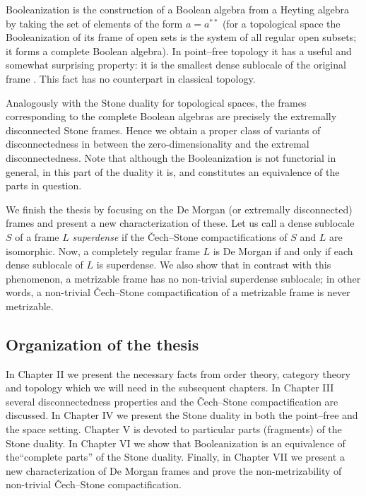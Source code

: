 \medskip

Booleanization is the construction of a Boolean algebra from a Heyting algebra by taking the set of elements of the form $a=a^{**}$ (for a topological space the Booleanization of its frame of open sets is the system of all regular open subsets; it forms a complete Boolean algebra). In point--free topology it has a useful and somewhat surprising property: it is the smallest dense sublocale of the original frame \cite{isbell1972atomless}. This fact has no counterpart in classical topology. 

Analogously with the Stone duality for topological spaces, the frames corresponding to the complete Boolean algebras are precisely the extremally disconnected Stone frames. Hence we obtain a proper class of variants of disconnectedness in between the zero-dimensionality and the extremal disconnectedness. Note that although the Booleanization is not functorial in general, in this part of the duality it is, and constitutes an equivalence of the parts in question.

\medskip 

 We finish the thesis by focusing on the De Morgan (or extremally disconnected) frames and present a new
 characterization of these. Let  us call a dense  sublocale $S$ of a frame $L$ {\em superdense} if the \v Cech--Stone compactifications of $S$ and $L$ are isomorphic. Now, a completely regular frame $L$ is De Morgan  if and only if
 each dense sublocale of $L$ is superdense. We also show  that in contrast with this phenomenon, a metrizable frame has no non-trivial superdense sublocale; in other words, a non-trivial  \v Cech--Stone compactification of a metrizable frame is never metrizable.


\subsection*{Organization of the thesis}

In Chapter II we present the necessary facts from order theory, category theory and topology which we will need in the subsequent chapters. In Chapter III several disconnectedness properties and the \v Cech--Stone compactification are discussed. In Chapter IV we present the Stone duality in both the point--free and the space setting. Chapter  V is devoted to particular parts (fragments) of the Stone duality. In Chapter VI we show that Booleanization is an equivalence of the``complete parts'' of the Stone duality. Finally, in Chapter VII we present a new characterization of De Morgan frames and prove the non-metrizability of non-trivial \v Cech--Stone compactification.



